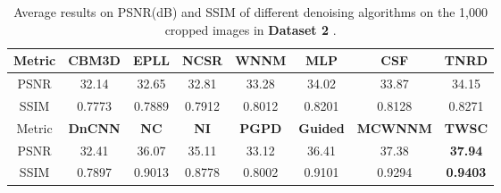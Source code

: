 \begin{table}[t!]
\caption{Average results on PSNR(dB) and SSIM of different denoising algorithms on the 1,000 cropped images in \textbf{Dataset 2} \cite{dnd2017}.}
\footnotesize
\label{tab6-7}
\begin{center}
\renewcommand\arraystretch{1.2}
\begin{tabular*}{1\textwidth}{@{\extracolsep{\fill}}cccccccc}
\hline
Metric
&
\textbf{CBM3D}
&
\textbf{EPLL}
&
\textbf{NCSR}
&
\textbf{WNNM}
&
\textbf{MLP}
&
\textbf{CSF}
&
\textbf{TNRD}
\\
\hline
PSNR & 32.14 &  32.65 & 32.81 & 33.28  & 34.02  & 33.87  & 34.15
\\
\hline
SSIM & 0.7773 & 0.7889  & 0.7912  & 0.8012  &  0.8201 & 0.8128  & 0.8271
\\
\hline
Metric

&
\textbf{DnCNN}
&
\textbf{NC}
&
\textbf{NI}
&
\textbf{PGPD}
&
\textbf{Guided}
&
\textbf{MCWNNM}
&
\textbf{TWSC}
\\
\hline
PSNR & 32.41 & 36.07 & 35.11 & 33.12 & 36.41 & 37.38 &  \textbf{37.94}
\\
\hline
SSIM & 0.7897 & 0.9013 & 0.8778 & 0.8002 & 0.9101 & 0.9294 &  \textbf{0.9403}
\\
\hline
\end{tabular*}
\end{center}
\end{table}

